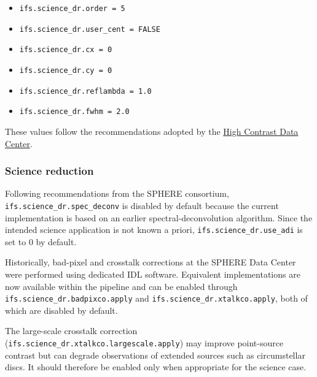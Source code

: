 \begin{itemize}
\item \texttt{ifs.science\_dr.order = 5}
\item \texttt{ifs.science\_dr.user\_cent = FALSE}
\item \texttt{ifs.science\_dr.cx = 0}
\item \texttt{ifs.science\_dr.cy = 0}
\item \texttt{ifs.science\_dr.reflambda = 1.0}
\item \texttt{ifs.science\_dr.fwhm = 2.0}
\end{itemize}

These values follow the recommendations adopted by the \href{https://hc-dc.cnrs.fr/}{High Contrast Data Center}.

\subsubsection{Science reduction}
\label{sec:science_dr}

Following recommendations from the SPHERE consortium,
\texttt{ifs.science\_dr.spec\_deconv} is disabled by default because the
current implementation is based on an earlier spectral-deconvolution
algorithm. Since the intended science application is not known a priori,
\texttt{ifs.science\_dr.use\_adi} is set to 0 by default.

Historically, bad-pixel and crosstalk corrections at the SPHERE Data
Center were performed using dedicated IDL software. Equivalent
implementations are now available within the pipeline and can be enabled
through \texttt{ifs.science\_dr.badpixco.apply} and
\texttt{ifs.science\_dr.xtalkco.apply}, both of which are disabled by
default.

The large-scale crosstalk correction
(\texttt{ifs.science\_dr.xtalkco.largescale.apply}) may improve point-source
contrast but can degrade observations of extended sources such as
circumstellar discs. It should therefore be enabled only when appropriate
for the science case.